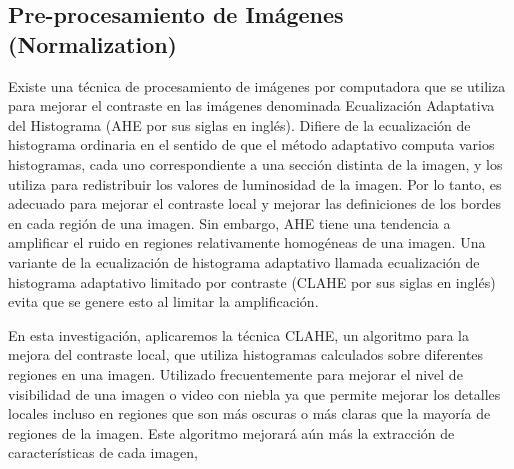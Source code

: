 	\subsection{Pre-procesamiento de Imágenes (Normalization)}
		Existe una técnica de procesamiento de imágenes por computadora que se utiliza para mejorar el contraste en las imágenes denominada Ecualización Adaptativa del Histograma (AHE por sus siglas en inglés). Difiere de la ecualización de histograma ordinaria en el sentido de que el método adaptativo computa varios histogramas, cada uno correspondiente a una sección distinta de la imagen, y los utiliza para redistribuir los valores de luminosidad de la imagen. Por lo tanto, es adecuado para mejorar el contraste local y mejorar las definiciones de los bordes en cada región de una imagen. Sin embargo, AHE tiene una tendencia a amplificar el ruido en regiones relativamente homogéneas de una imagen. Una variante de la ecualización de histograma adaptativo llamada ecualización de histograma adaptativo limitado por contraste (CLAHE por sus siglas en inglés) evita que se genere esto al limitar la amplificación.

		En esta investigación, aplicaremos la técnica CLAHE, un algoritmo para la mejora del contraste local, que utiliza histogramas calculados sobre diferentes regiones en una imagen. Utilizado frecuentemente para mejorar el nivel de visibilidad de una imagen o video con niebla ya que permite mejorar los detalles locales incluso en regiones que son más oscuras o más claras que la mayoría de regiones de la imagen. Este algoritmo mejorará aún más la extracción de características de cada imagen, \citep{CLAHE}

